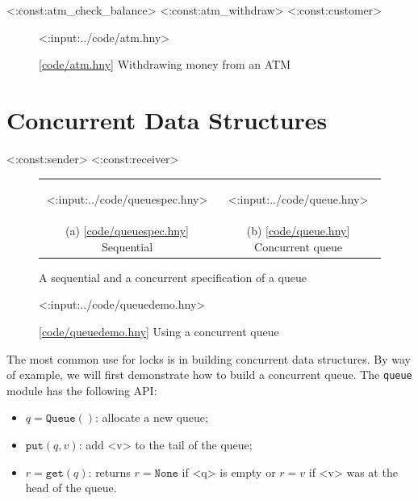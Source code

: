 \documentclass{report}
\newcommand{\harmonylink}[1]{%
[\href{https://harmony.cs.cornell.edu/#1}{\underline{#1}}]%
}
\newenvironment{code}{
\tcolorbox
}{
\endtcolorbox
}
\begin{document}
<{:const:atm_check_balance}>
<{:const:atm_withdraw}>
<{:const:customer}>

\begin{figure}
\begin{code}
<{:input:../code/atm.hny}>
\end{code}
\caption{\harmonylink{code/atm.hny} Withdrawing money from an ATM}
\label{fig:atm}
\end{figure}

\chapter{Concurrent Data Structures}
\label{ch:cds}

<{:const:sender}>
<{:const:receiver}>

\begin{figure}[h]
\begin{center}
\begin{tabular}{cc}
\begin{tcolorbox}[width=0.42\linewidth]
<{:input:../code/queuespec.hny}>
\end{tcolorbox}
&
\begin{tcolorbox}[width=0.53\linewidth]
<{:input:../code/queue.hny}>
\end{tcolorbox}
\\
(a) \harmonylink{code/queuespec.hny} Sequential & (b) \harmonylink{code/queue.hny} Concurrent queue
\end{tabular}
\end{center}
\caption{A sequential and a concurrent specification of a queue}
\label{fig:queues}
\end{figure}

\begin{figure}
\begin{code}
<{:input:../code/queuedemo.hny}>
\end{code}
\caption{\harmonylink{code/queuedemo.hny} Using a concurrent queue}
\label{fig:queuedemo}
\end{figure}

The most common use for locks is in building concurrent data structures.
By way of example, we will first demonstrate how to build a concurrent queue.
The \texttt{queue} module has the following API:
\begin{itemize}
\item $q = \mathtt{Queue}()$: allocate a new queue;
\item $\mathtt{put}(q, v)$: add <{v}> to the tail of the queue;
\item $r = \mathtt{get}(q)$: returns $r = \mathtt{None}$
if <{q}> is empty or $r = v$ if <{v}> was at the head of the queue.
\end{itemize}
\end{document}
